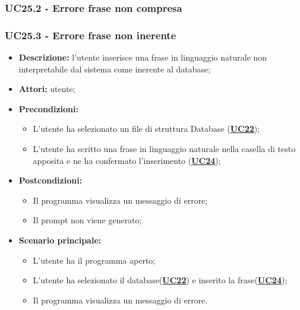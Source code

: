 \subsubsection{UC25.2 - Errore frase non compresa}
\label{sec:UC25.2}

\subsubsection{UC25.3 - Errore frase non inerente}
\label{sec:UC25.3}
\begin{itemize}
	\item \textbf{Descrizione:} l’utente inserisce una frase in linguaggio naturale non interpretabile dal sistema come inerente al database;
	\item \textbf{Attori:} utente;
	\item \textbf{Precondizioni:} 
	\begin{itemize}
		\item L’utente ha selezionato un file di struttura Database (\hyperref[sec:UC22]{\textbf{UC22}});
		\item L’utente ha scritto una frase in linguaggio naturale nella casella di testo apposita e ne ha confermato l’inserimento (\hyperref[sec:UC24]{\textbf{UC24}});
	\end{itemize}
	\item \textbf{Postcondizioni:} 
	\begin{itemize}
		\item Il programma visualizza un messaggio di errore;
		\item Il prompt non viene generato;
	\end{itemize}
	\item \textbf{Scenario principale:} 
	\begin{itemize}
		\item L’utente ha il programma aperto;
		\item L’utente ha selezionato il database(\hyperref[sec:UC22]{\textbf{UC22}}) e inserito la frase(\hyperref[sec:UC24]{\textbf{UC24}});
		\item Il programma visualizza un messaggio di errore.
	\end{itemize}
\end{itemize}

